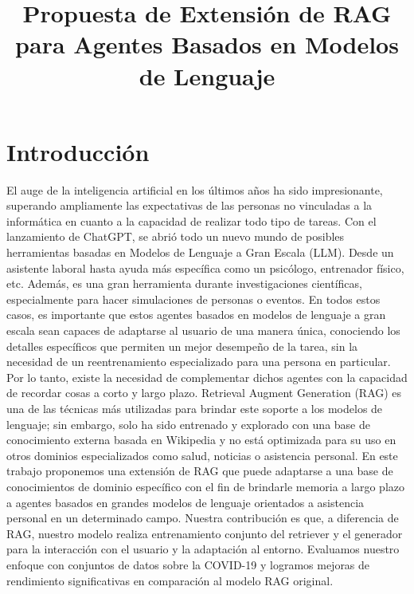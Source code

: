 \documentclass{article}
\title{Propuesta de Extensión de RAG para Agentes Basados en Modelos de Lenguaje}
\author{}
\date{}
\begin{document}
\maketitle
\section{Introducción}
El auge de la inteligencia artificial en los últimos años ha sido impresionante, superando ampliamente las expectativas de las personas no vinculadas a la informática en cuanto a la capacidad de realizar todo tipo de tareas. Con el lanzamiento de ChatGPT, se abrió todo un nuevo mundo de posibles herramientas basadas en Modelos de Lenguaje a Gran Escala (LLM). Desde un asistente laboral hasta ayuda más específica como un psicólogo, entrenador físico, etc. Además, es una gran herramienta durante investigaciones científicas, especialmente para hacer simulaciones de personas o eventos. En todos estos casos, es importante que estos agentes basados en modelos de lenguaje a gran escala sean capaces de adaptarse al usuario de una manera única, conociendo los detalles específicos que permiten un mejor desempeño de la tarea, sin la necesidad de un reentrenamiento especializado para una persona en particular. Por lo tanto, existe la necesidad de complementar dichos agentes con la capacidad de recordar cosas a corto y largo plazo. Retrieval Augment Generation (RAG) es una de las técnicas más utilizadas para brindar este soporte a los modelos de lenguaje; sin embargo, solo ha sido entrenado y explorado con una base de conocimiento externa basada en Wikipedia y no está optimizada para su uso en otros dominios especializados como salud, noticias o asistencia personal.
En este trabajo proponemos una extensión de RAG que puede adaptarse a una base de conocimientos de dominio específico con el fin de brindarle memoria a largo plazo a agentes basados en grandes modelos de lenguaje orientados a asistencia personal en un determinado campo. Nuestra contribución es que, a diferencia de RAG, nuestro modelo realiza entrenamiento conjunto del retriever y el generador para la interacción con el usuario y la adaptación al entorno. Evaluamos nuestro enfoque con conjuntos de datos sobre la COVID-19 y logramos mejoras de rendimiento significativas en comparación al modelo RAG original.
\end{document}
